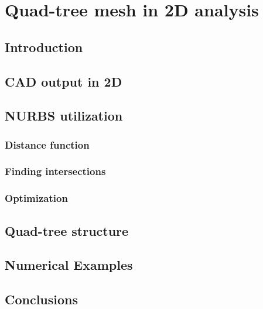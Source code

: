 
\chapter{Quad-tree mesh in 2D analysis}

\section{Introduction}

\section{CAD output in 2D}

\section{NURBS utilization}

    \subsection{Distance function}

    \subsection{Finding intersections}

    \subsection{Optimization}

\section{Quad-tree structure}

\section{Numerical Examples}

\section{Conclusions}